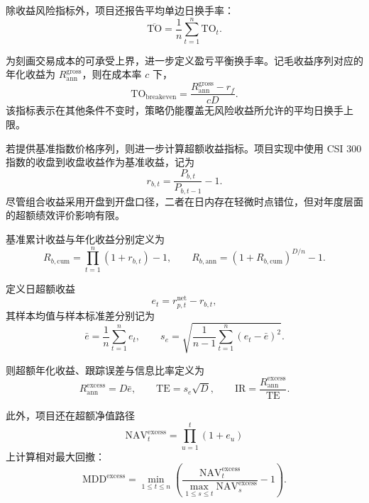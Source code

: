\documentclass[12pt, a4paper, oneside]{article}
\begin{document}
除收益风险指标外，项目还报告平均单边日换手率：
\begin{equation}
\overline{\mathrm{TO}} = \frac{1}{n}\sum_{t=1}^{n}\mathrm{TO}_t.
\end{equation}

为刻画交易成本的可承受上界，进一步定义盈亏平衡换手率。记毛收益序列对应的年化收益为 \(R_{\mathrm{ann}}^{\mathrm{gross}}\)，则在成本率 \(c\) 下，
\begin{equation}
\mathrm{TO}_{\mathrm{breakeven}} = \frac{R_{\mathrm{ann}}^{\mathrm{gross}} - r_f}{cD}.
\end{equation}
该指标表示在其他条件不变时，策略仍能覆盖无风险收益所允许的平均日换手上限。

若提供基准指数价格序列，则进一步计算超额收益指标。项目实现中使用 CSI 300 指数的收盘到收盘收益作为基准收益，记为
\begin{equation}
r_{b,t} = \frac{P_{b,t}}{P_{b,t-1}} - 1.
\end{equation}
尽管组合收益采用开盘到开盘口径，二者在日内存在轻微时点错位，但对年度层面的超额绩效评价影响有限。

基准累计收益与年化收益分别定义为
\begin{equation}
R_{b,\mathrm{cum}} = \prod_{t=1}^{n}(1+r_{b,t}) - 1, \qquad R_{b,\mathrm{ann}} = (1 + R_{b,\mathrm{cum}})^{D/n} - 1.
\end{equation}

定义日超额收益
\begin{equation}
e_t = r_{p,t}^{\mathrm{net}} - r_{b,t},
\end{equation}
其样本均值与样本标准差分别记为
\begin{equation}
\bar e = \frac{1}{n}\sum_{t=1}^{n}e_t, \qquad s_e = \sqrt{\frac{1}{n-1}\sum_{t=1}^{n}(e_t - \bar e)^2}.
\end{equation}

则超额年化收益、跟踪误差与信息比率定义为
\begin{equation}
R_{\mathrm{ann}}^{\mathrm{excess}} = D\bar e, \qquad \mathrm{TE} = s_e\sqrt{D}, \qquad \mathrm{IR} = \frac{R_{\mathrm{ann}}^{\mathrm{excess}}}{\mathrm{TE}}.
\end{equation}

此外，项目还在超额净值路径
\begin{equation}
\mathrm{NAV}_t^{\mathrm{excess}} = \prod_{u=1}^{t}(1+e_u)
\end{equation}
上计算相对最大回撤：
\begin{equation}
\mathrm{MDD}^{\mathrm{excess}} = \min_{1\le t\le n}\left(\frac{\mathrm{NAV}_t^{\mathrm{excess}}}{\max_{1\le s\le t}\mathrm{NAV}_s^{\mathrm{excess}}} - 1\right).
\end{equation}
\end{document}

